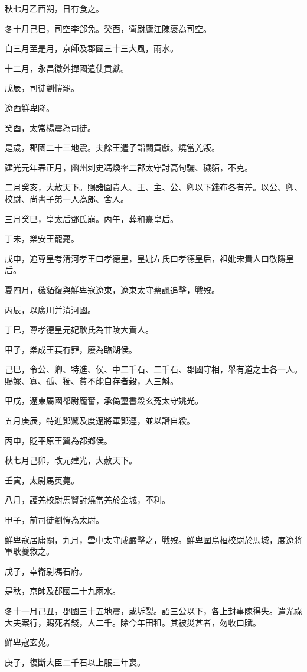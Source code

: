 \begin{pinyinscope}
秋七月乙酉朔，日有食之。

冬十月己巳，司空李郃免。癸酉，衛尉廬江陳褒為司空。

自三月至是月，京師及郡國三十三大風，雨水。

十二月，永昌徼外撣國遣使貢獻。

戊辰，司徒劉愷罷。

遼西鮮卑降。

癸酉，太常楊震為司徒。

是歲，郡國二十三地震。夫餘王遣子詣闕貢獻。燒當羌叛。

建光元年春正月，幽州刺史馮煥率二郡太守討高句驪、穢貊，不克。

二月癸亥，大赦天下。賜諸園貴人、王、主、公、卿以下錢布各有差。以公、卿、校尉、尚書子弟一人為郎、舍人。

三月癸巳，皇太后鄧氏崩。丙午，葬和熹皇后。

丁未，樂安王寵薨。

戊申，追尊皇考清河孝王曰孝德皇，皇妣左氏曰孝德皇后，祖妣宋貴人曰敬隱皇后。

夏四月，穢貊復與鮮卑寇遼東，遼東太守蔡諷追擊，戰歿。

丙辰，以廣川并清河國。

丁巳，尊孝德皇元妃耿氏為甘陵大貴人。

甲子，樂成王萇有罪，廢為臨湖侯。

己巳，令公、卿、特進、侯、中二千石、二千石、郡國守相，舉有道之士各一人。賜鰥、寡、孤、獨、貧不能自存者穀，人三斛。

甲戌，遼東屬國都尉龐奮，承偽璽書殺玄菟太守姚光。

五月庚辰，特進鄧騭及度遼將軍鄧遵，並以譖自殺。

丙申，貶平原王翼為都鄉侯。

秋七月己卯，改元建光，大赦天下。

壬寅，太尉馬英薨。

八月，護羌校尉馬賢討燒當羌於金城，不利。

甲子，前司徒劉愷為太尉。

鮮卑寇居庸關，九月，雲中太守成嚴擊之，戰歿。鮮卑圍烏桓校尉於馬城，度遼將軍耿夔救之。

戊子，幸衛尉馮石府。

是秋，京師及郡國二十九雨水。

冬十一月己丑，郡國三十五地震，或坼裂。詔三公以下，各上封事陳得失。遣光祿大夫案行，賜死者錢，人二千。除今年田租。其被災甚者，勿收口賦。

鮮卑寇玄菟。

庚子，復斷大臣二千石以上服三年喪。


\end{pinyinscope}
